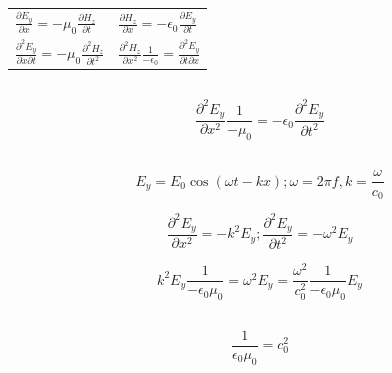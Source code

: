 \documentclass[a4paper,12pt]{article}
\begin{document}
\subsection{}
\begin{table}[h!]
    \centering
    \begin{tabularx}{\textwidth}{YY}
        $\frac{\partial E_y}{\partial x} = -\mu_0 \frac{\partial H_z}{\partial t}$                  & $\frac{\partial H_z}{\partial x} = -\epsilon_0 \frac{\partial E_y}{\partial t}$                             \\
        $\frac{\partial^2 E_y}{\partial x \partial t} = -\mu_0 \frac{\partial^2 H_z}{\partial t^2}$ & $\frac{\partial^2 H_z}{\partial x^2} \frac{1}{- \epsilon_0} = \frac{\partial^2 E_y}{\partial t \partial x}$ \\
    \end{tabularx}
\end{table}

\subsection{}
\begin{equation}
    \frac{\partial^2 E_y}{\partial x^2} \frac{1}{- \mu_0} = -\epsilon_0 \frac{\partial^2 E_y}{\partial t^2}
\end{equation}


\subsection{}
\begin{equation}
    E_y = E_0 \cos(\omega t - k x); \omega = 2 \pi f, k = \frac{\omega}{c_0}
\end{equation}

\begin{equation}
    \frac{\partial^2 E_y}{\partial x^2} = -k^2 E_y; \frac{\partial^2 E_y}{\partial t^2} = -\omega^2 E_y
\end{equation}

\begin{equation}
    k^2 E_y \frac{1}{- \epsilon_0 \mu_0} =  \omega^2 E_y = \frac{\omega^2}{c_0^2} \frac{1}{- \epsilon_0 \mu_0} E_y
\end{equation}

\subsection{}
\begin{equation}
    \frac{1}{\epsilon_0 \mu_0} = c_0^2
\end{equation}
\end{document}
